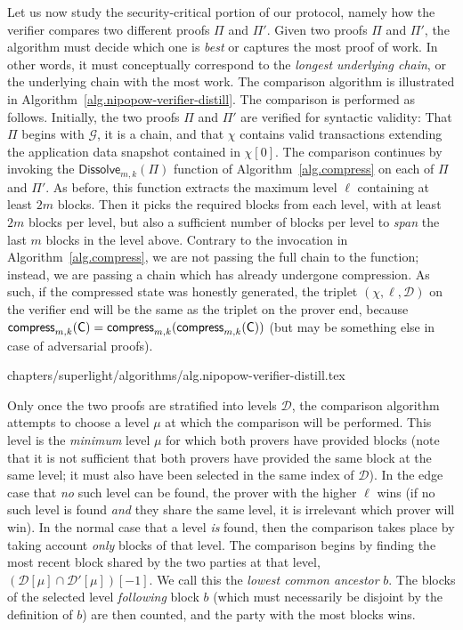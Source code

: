 Let us now study the security-critical portion of our protocol, namely how the verifier
compares two different proofs $\Pi$ and $\Pi'$. Given two proofs $\Pi$ and $\Pi'$, the algorithm
must decide which one is \emph{best} or captures the most proof of work. In other words,
it must conceptually correspond to the \emph{longest underlying chain}, or the underlying chain with the
most work. The comparison algorithm is illustrated
in Algorithm~\ref{alg.nipopow-verifier-distill}. The comparison is performed as follows. Initially,
the two proofs $\Pi$ and $\Pi'$ are verified for syntactic validity: That $\Pi$ begins
with $\mathcal{G}$, it is a chain, and that $\chi$ contains valid transactions extending
the application data snapshot contained in $\chi[0]$. The comparison continues by
invoking the $\textsf{Dissolve}_{m,k}(\Pi)$ function of Algorithm~\ref{alg.compress}
on each of $\Pi$ and $\Pi'$.
As before, this function extracts the maximum level $\ell$ containing at least $2m$
blocks. Then it picks the required blocks from each level, with at least $2m$ blocks
per level, but also a sufficient number of blocks per level to \emph{span} the last $m$
blocks in the level above.
Contrary to the invocation in Algorithm~\ref{alg.compress}, we are not passing
the full chain to the function; instead, we are passing a chain which has already
undergone compression. As such, if the compressed state was honestly generated,
the triplet $(\chi, \ell, \mathcal{D})$ on the verifier end will be the same
as the triplet on the prover end, because
$\textsf{compress}_{m,k}(\mathsf{C}) = \textsf{compress}_{m,k}(\textsf{compress}_{m,k}(\mathsf{C}))$
(but may be something else in case of adversarial
proofs).

{chapters/superlight/algorithms/alg.nipopow-verifier-distill.tex}

Only once the two proofs are stratified into levels $\mathcal{D}$,
the comparison algorithm attempts to choose a level $\mu$ at which the comparison
will be performed. This level is the \emph{minimum} level $\mu$ for which both provers
have provided blocks (note that it is not sufficient that both provers have provided
the same block at the same level; it must also have been selected in the same index
of $\mathcal{D}$). In the edge case that \emph{no} such level can be found, the prover
with the higher $\ell$ wins (if no such level is found \emph{and} they share the
same level, it is irrelevant which prover will win). In the normal case that a level
\emph{is} found, then the comparison takes place by taking account \emph{only} blocks of
that level. The comparison begins by finding the most recent block shared by
the two parties at that level, $(\mathcal{D}[\mu] \cap \mathcal{D}'[\mu])[-1]$.
We call this the \emph{lowest common ancestor} $b$.
The blocks of the selected level \emph{following} block $b$ (which must necessarily
be disjoint by the definition of $b$) are then counted, and the party with the
most blocks wins.

